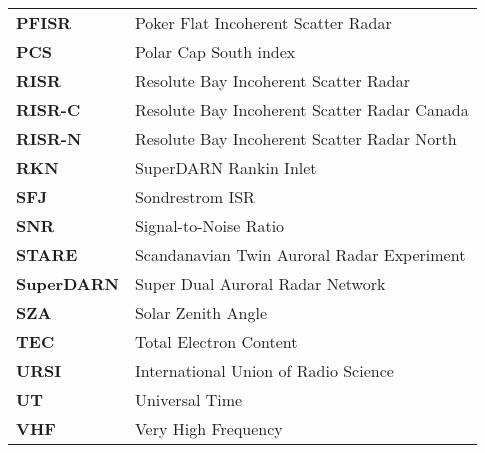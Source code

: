 \begin{longtable}{ll}
\textbf{PFISR} & Poker Flat Incoherent Scatter Radar \\
\textbf{PCS} & Polar Cap South index \\
\textbf{RISR} & Resolute Bay Incoherent Scatter Radar \\
\textbf{RISR-C} & Resolute Bay Incoherent Scatter Radar Canada \\
\textbf{RISR-N} & Resolute Bay Incoherent Scatter Radar North \\
\textbf{RKN} & SuperDARN Rankin Inlet \\
\textbf{SFJ} & Sondrestrom ISR \\
\textbf{SNR} & Signal-to-Noise Ratio \\
\textbf{STARE} & Scandanavian Twin Auroral Radar Experiment \\
\textbf{SuperDARN} & Super Dual Auroral Radar Network \\
\textbf{SZA} & Solar Zenith Angle \\
\textbf{TEC} & Total Electron Content \\
\textbf{URSI} & International Union of Radio Science \\
\textbf{UT} & Universal Time \\
\textbf{VHF} & Very High Frequency \\
\end{longtable}